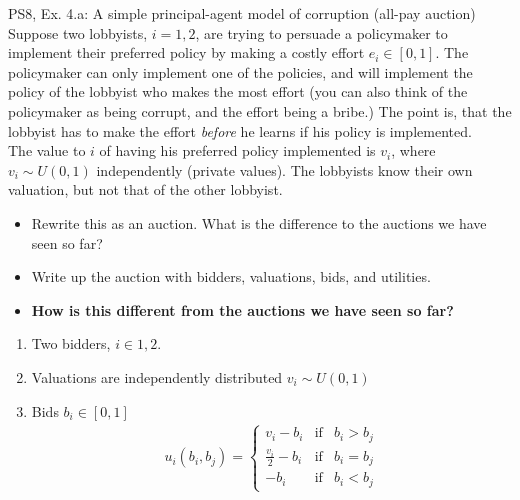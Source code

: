 \begin{frame}{PS8, Ex. 4.a: A simple principal-agent model of corruption (all-pay auction)}
    Suppose two lobbyists, $i = 1, 2$, are trying to persuade a policymaker to implement their preferred policy by making a costly effort $e_i\in[0, 1]$. The policymaker can only implement one of the policies, and will implement the policy of the lobbyist who makes the most effort (you can also think of the policymaker as being corrupt, and the effort being a bribe.) The point is, that the lobbyist has to make the effort \textit{before} he learns if his policy is implemented.\\\medskip
    The value to $i$ of having his preferred policy implemented is $v_i$, where $v_i\sim U(0, 1)$ independently (private values). The lobbyists know their own valuation, but not that of the other lobbyist.
    \begin{itemize}
      \item[(a)] Rewrite this as an auction. What is the difference to the auctions we have seen so far?
    \end{itemize}
    \vspace{-8pt}
    \begin{multicols}{2}
      \begin{itemize}
        \item[Step 1:] Write up the auction with bidders, valuations, bids, and utilities.
        \item[Step 2:] \textbf{How is this different from the auctions we have seen so far?}
      \end{itemize}
      \vfill\null\columnbreak
      \begin{enumerate}
        \item Two bidders, $i\in1,2$.
        \item[] Valuations are independently distributed $v_i\sim U(0, 1)$
        \item[] Bids $b_i\in[0,1]$
        \begin{align*}
          u_i(b_i,b_j)=\left\{\begin{array}{lcl}
            v_i-b_i           & \text{if} & b_i>b_j \\
            \frac{v_i}{2}-b_i & \text{if} & b_i=b_j \\
            -b_i              & \text{if} & b_i<b_j
          \end{array}\right.
        \end{align*}
      \end{enumerate}
      \vfill\null
    \end{multicols}
\end{frame}
